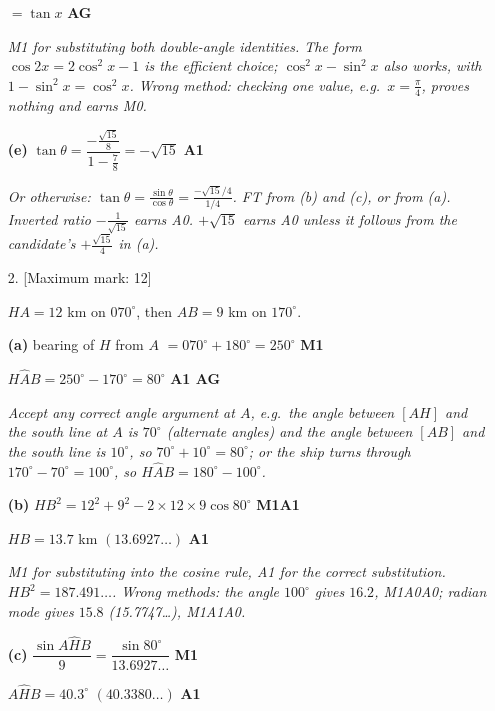 \documentclass[12pt, twoside]{article}
\begin{document}
\begin{enumerate}[itemsep=0.1cm]
$= \tan x$ \hfill \textbf{AG}

\emph{M1 for substituting both double-angle identities. The form
$\cos 2x = 2\cos^{2}x - 1$ is the efficient choice; $\cos^{2}x - \sin^{2}x$
also works, with $1 - \sin^{2}x = \cos^{2}x$. Wrong method: checking one
value, e.g.\ $x = \frac{\pi}{4}$, proves nothing and earns M0.}

\textbf{(e)} $\tan\theta = \dfrac{-\frac{\sqrt{15}}{8}}{1 - \frac{7}{8}}
= -\sqrt{15}$ \hfill \textbf{A1}

\emph{Or otherwise: $\tan\theta = \frac{\sin\theta}{\cos\theta}
= \frac{-\sqrt{15}/4}{1/4}$. FT from (b) and (c), or from (a). Inverted
ratio $-\frac{1}{\sqrt{15}}$ earns A0. $+\sqrt{15}$ earns A0 unless it
follows from the candidate's $+\frac{\sqrt{15}}{4}$ in (a).}

\newpage

\item[2.] [Maximum mark: 12]

$HA = 12$ km on $070^\circ$, then $AB = 9$ km on $170^\circ$.

\textbf{(a)} bearing of $H$ from $A$ $= 070^\circ + 180^\circ = 250^\circ$
\hfill \textbf{M1}

$H\hat{A}B = 250^\circ - 170^\circ = 80^\circ$ \hfill \textbf{A1 AG}

\emph{Accept any correct angle argument at $A$, e.g.\ the angle between
$[AH]$ and the south line at $A$ is $70^\circ$ (alternate angles) and the
angle between $[AB]$ and the south line is $10^\circ$, so
$70^\circ + 10^\circ = 80^\circ$; or the ship turns through
$170^\circ - 70^\circ = 100^\circ$, so $H\hat{A}B = 180^\circ - 100^\circ$.}

\textbf{(b)} $HB^{2} = 12^{2} + 9^{2} - 2 \times 12 \times 9\cos 80^\circ$
\hfill \textbf{M1A1}

$HB = 13.7$ km \quad $(13.6927\ldots)$ \hfill \textbf{A1}

\emph{M1 for substituting into the cosine rule, A1 for the correct
substitution. $HB^{2} = 187.491\ldots$. Wrong methods: the angle
$100^\circ$ gives $16.2$, M1A0A0; radian mode gives $15.8$
(15.7747\ldots), M1A1A0.}

\textbf{(c)} $\dfrac{\sin A\hat{H}B}{9} = \dfrac{\sin 80^\circ}{13.6927\ldots}$
\hfill \textbf{M1}

$A\hat{H}B = 40.3^\circ$ \quad $(40.3380\ldots)$ \hfill \textbf{A1}


\end{enumerate}
\end{document}
